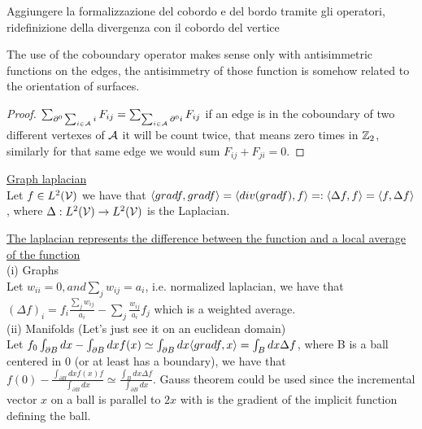 \documentclass[../main.tex]{subfiles}
\begin{document}
Aggiungere la formalizzazione del cobordo e del bordo tramite gli operatori, ridefinizione della divergenza con il cobordo del vertice
	
\begin{prop}
    The use of the coboundary operator makes sense only with antisimmetric functions on the edges, the antisimmetry of
    those function is somehow related to the orientation of surfaces.
\end{prop}
\begin{proof}
    $\sum_{\partial^0 \sum_{i \in \mathcal{A}} i}F_{ij} = \sum_{\sum_{i \in \mathcal{A}} \partial^0 i} F_{ij}$ if an edge
    is in the coboundary of two different vertexes of $\mathcal{A}$ it will be count twice, that means zero times in $\mathbb{Z}_2$,
    similarly for that same edge we would sum $F_{ij} + F_{ji} = 0$.
\end{proof}

    
\begin{defn}
    \underline{Graph laplacian}\\
    Let $f \in L^2(\mathcal{V})$ we have that $\langle gradf, gradf \rangle = \langle div(gradf), f \rangle =: \langle \Delta f, f \rangle = \langle f, \Delta f \rangle$, where
    $\Delta : L^2(\mathcal{V}) \to L^2(\mathcal{V})$ is the Laplacian.
\end{defn}

\begin{prop}
    \underline{The laplacian represents the difference between the function and a local average of the function}\\
    (i) Graphs\\
    Let $w_{ii} = 0, and \sum_{j} w_{ij} = a_i$, i.e. normalized laplacian, we have that
    $(\Delta f)_i = f_i\frac{\sum_j w_{ij}}{a_i}-\sum_j\frac{w_{ij}}{a_i}f_j$ which is a weighted average.\\
    (ii) Manifolds (Let's just see it on an euclidean domain)\\
    Let $f_0 \int_{\partial B} dx - \int_{\partial B} dx f(x) \simeq \int_{\partial B} dx \langle grad f, x \rangle = \int_B dx \Delta f$, where 
    B is a ball centered in 0 (or at least has a boundary), we have that $ f(0)-\frac{\int_{\partial B} dx f(x) f}{\int_{\partial B} dx}
    \simeq \frac{\int_B dx \Delta f}{\int_{\partial B} dx}$. Gauss theorem could be used since the incremental vector $x$ on a ball
    is parallel to $2x$ with is the gradient of the implicit function defining the ball.
\end{prop}
\end{document}
